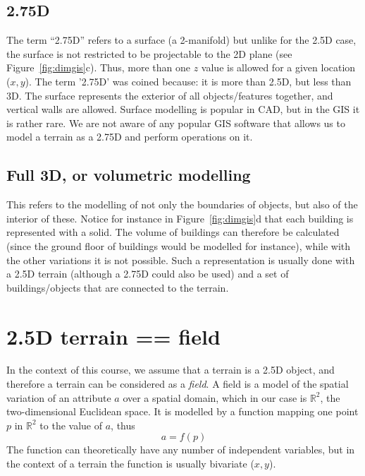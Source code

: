 \subsection{2.75D}%
The term ``2.75D'' refers to a surface (a 2-manifold) but unlike for the 2.5D case, the surface is not restricted to be projectable to the 2D plane (see Figure~\ref{fig:dimgis}c).
Thus, more than one $z$ value is allowed for a given location ($x,y$).
The term '2.75D' was coined because: it is more than 2.5D, but less than 3D.
The surface represents the exterior of all objects/features together, and vertical walls are allowed.
Surface modelling is popular in CAD, but in the GIS it is rather rare.
We are not aware of any popular GIS software that allows us to model a terrain as a 2.75D and perform operations on it.

\subsection[3D]{Full 3D, or volumetric modelling} 
This refers to the modelling of not only the boundaries of objects, but also of the interior of these.
Notice for instance in Figure~\ref{fig:dimgis}d that each building is represented with a solid.
The volume of buildings can therefore be calculated (since the ground floor of buildings would be modelled for instance), while with the other variations it is not possible. 
Such a representation is usually done with a 2.5D terrain (although a 2.75D could also be used) and a set of buildings/objects that are connected to the terrain.



%
\section{2.5D terrain == field}

In the context of this course, we assume that a terrain is a 2.5D object, and therefore a terrain can be considered as a \emph{field}.%
A field is a model of the spatial variation of an attribute $a$ over a spatial domain, which in our case is $\mathbb{R}^2$, the two-dimensional Euclidean space.%
It is modelled by a function mapping one point $p$ in $\mathbb{R}^2$ to the value of $a$, thus 
\[
  a = f(p)
\]
The function can theoretically have any number of independent variables, but in the context of a terrain the function is usually bivariate ($x,y$).

